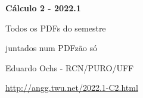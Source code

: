 \documentclass[oneside,12pt]{article}
\begin{document}

\def\drafturl{http://angg.twu.net/LATEX/2022-1-C2.pdf}
\def\drafturl{http://angg.twu.net/2022.1-C2.html}
\def\draftfooter{\tiny \href{\drafturl}{\jobname{}} \ColorBrown{\shorttoday{} \hours}}



%

\thispagestyle{empty}

\begin{center}

\vspace*{1.2cm}

{\bf \Large Cálculo 2 - 2022.1}

\bsk

Todos os PDFs do semestre

juntados num PDFzão só

\bsk

Eduardo Ochs - RCN/PURO/UFF

\url{http://angg.twu.net/2022.1-C2.html}

\end{center}

\newpage

\def\incl#1{}

\incl{2022-1-C2-intro}

\incl{2022-1-C2-somas-3}

\incl{2022-1-C2-infs-e-sups}

\incl{2022-1-C2-TFC1}

\incl{2022-1-C2-MT1}

\incl{2022-1-C2-der-fun-inv}
\end{document}
